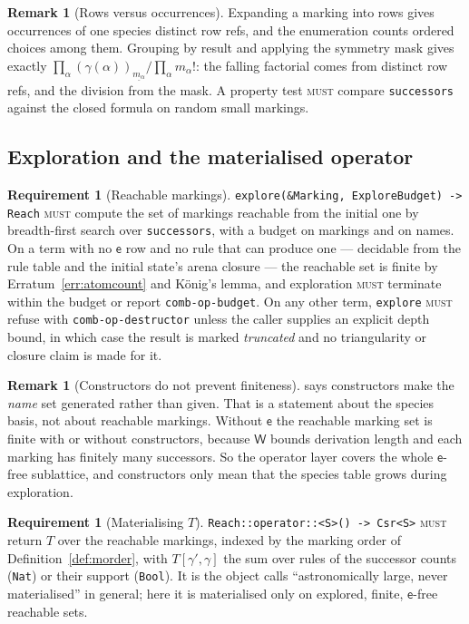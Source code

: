 \documentclass[11pt,a4paper]{article}
\newcommand{\code}[1]{\texttt{#1}}
\newcommand{\MUST}{\textsc{must}}
\newcommand{\ev}{\mathsf{e}}
\newcommand{\Wt}{\mathsf{W}}
\theoremstyle{definition}
\newtheorem{requirement}[definition]{Requirement}
\newtheorem{remark}[definition]{Remark}
\theoremstyle{plain}
\begin{document}
\begin{remark}[Rows versus occurrences]
Expanding a marking into rows gives occurrences of one species distinct row
refs, and the enumeration counts ordered choices among them. Grouping by
result and applying the symmetry mask gives exactly
$\prod_{\alpha}(\gamma(\alpha))_{\underline{m_\alpha}}/\prod_\alpha
m_\alpha!$: the falling factorial comes from distinct row refs, and the
division from the mask. A property test \MUST{} compare \code{successors}
against the closed formula on random small markings.
\end{remark}

\subsection{Exploration and the materialised operator}

\begin{requirement}[Reachable markings]\label{req:reach}
\code{explore(\&Marking, ExploreBudget) -> Reach} \MUST{} compute the set of
markings reachable from the initial one by breadth-first search over
\code{successors}, with a budget on markings and on names. On a term with no
$\ev$ row and no rule that can produce one --- decidable from the rule table
and the initial state's arena closure --- the reachable set is finite by
Erratum~\ref{err:atomcount} and König's lemma, and exploration \MUST{}
terminate within the budget or report \code{comb-op-budget}. On any other
term, \code{explore} \MUST{} refuse with \code{comb-op-destructor} unless the
caller supplies an explicit depth bound, in which case the result is marked
\emph{truncated} and no triangularity or closure claim is made for it.
\end{requirement}

\begin{remark}[Constructors do not prevent finiteness]
\cite[Thm.~6.1(i)]{matnote} says constructors make the \emph{name} set
generated rather than given. That is a statement about the species basis, not
about reachable markings. Without $\ev$ the reachable marking set is finite
with or without constructors, because $\Wt$ bounds derivation length and each
marking has finitely many successors. So the operator layer covers the whole
$\ev$-free sublattice, and constructors only mean that the species table grows
during exploration.
\end{remark}

\begin{requirement}[Materialising $T$]\label{req:T}
\code{Reach::operator::<S>() -> Csr<S>} \MUST{} return $T$ over the reachable
markings, indexed by the marking order of Definition~\ref{def:morder}, with
$T[\gamma',\gamma]$ the sum over rules of the successor counts (\code{Nat}) or
their support (\code{Bool}). It is the object \cite[\S7]{matnote} calls
``astronomically large, never materialised'' in general; here it is
materialised only on explored, finite, $\ev$-free reachable sets.
\end{requirement}
\end{document}

